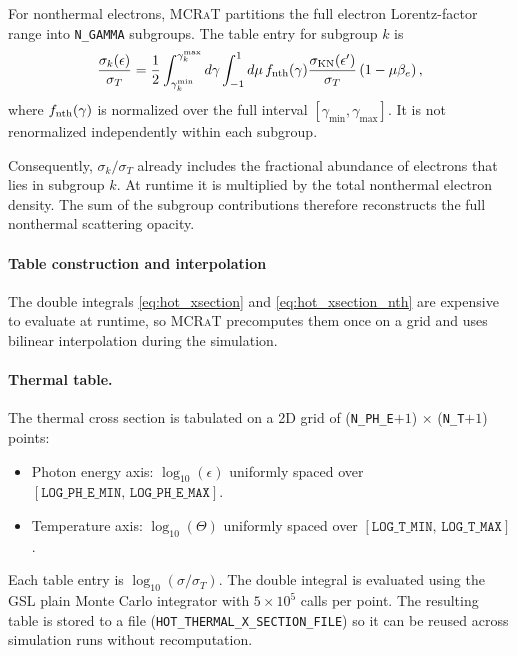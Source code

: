 \documentclass[12pt,a4paper]{article}
\newcommand{\gmin}{\gamma_{\min}}
\newcommand{\gmax}{\gamma_{\max}}
\newcommand{\code}[1]{\texttt{#1}}
\newcommand{\mcrat}{\textsc{MCRaT}}
\begin{document}
For nonthermal electrons, \mcrat{} partitions the full electron Lorentz-factor
range into \code{N\_GAMMA} subgroups. The table entry for subgroup \(k\)
is
\begin{equation}
	\frac{\sigma_k(\epsilon)}{\sigma_T}
	=
	\frac{1}{2}
	\int_{\gamma_k^{\min}}^{\gamma_k^{\max}}
	d\gamma
	\int_{-1}^{1}
	d\mu\,
	f_{\rm nth}(\gamma)
	\frac{\sigma_{\rm KN}(\epsilon')}{\sigma_T}
	\left(1-\mu\beta_e\right),
	\label{eq:hot_xsection_nth}
\end{equation}
where \(f_{\rm nth}(\gamma)\) is normalized over the full interval
\([\gmin,\gmax]\). It is not renormalized independently within each
subgroup.

Consequently, \(\sigma_k/\sigma_T\) already includes the fractional
abundance of electrons that lies in subgroup \(k\). At runtime it is
multiplied by the total nonthermal electron density. The sum of the
subgroup contributions therefore reconstructs the full nonthermal
scattering opacity.

\paragraph{Table construction and interpolation}
\label{sec:table_construction}

The double integrals \eqref{eq:hot_xsection} and \eqref{eq:hot_xsection_nth}
are expensive to evaluate at runtime, so \mcrat{} precomputes them once on a
grid and uses bilinear interpolation during the simulation.

\paragraph{Thermal table.}
The thermal cross section is tabulated on a 2D grid of
(\code{N\_PH\_E}$+1$) $\times$ (\code{N\_T}$+1$) points:
\begin{itemize}
	\item Photon energy axis: $\log_{10}(\epsilon)$ uniformly spaced
	over $[\code{LOG\_PH\_E\_MIN},\,\code{LOG\_PH\_E\_MAX}]$.
	\item Temperature axis: $\log_{10}(\Theta)$ uniformly spaced
	over $[\code{LOG\_T\_MIN},\,\code{LOG\_T\_MAX}]$.
\end{itemize}
Each table entry is $\log_{10}(\sigma/\sigma_T)$.  The double integral is
evaluated using the GSL plain Monte Carlo integrator with $5\times10^5$
calls per point.  The resulting table is stored to a file
(\code{HOT\_THERMAL\_X\_SECTION\_FILE}) so it can be reused across
simulation runs without recomputation.
\end{document}
